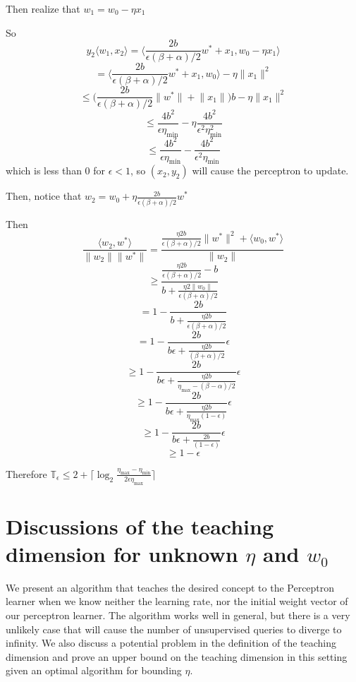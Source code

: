 \documentclass{article}
\begin{document}
Then realize that
$w_1 = w_0 - \eta x_1$

So
$$
y_2 \langle w_1, x_2 \rangle  = \bigg\langle \frac{2 b}{\epsilon (\beta + \alpha) /2} w^* + x_1 , w_0 - \eta x_1 \bigg\rangle
$$
$$
= \bigg\langle \frac{2 b}{\epsilon (\beta + \alpha) /2} w^* + x_1 , w_0  \bigg\rangle - \eta \lVert x_1 \rVert^2
$$
$$
\leq \bigg( \frac{2 b}{\epsilon (\beta + \alpha) /2} \lVert w^* \rVert + \lVert x_1 \rVert \bigg ) b - \eta \lVert x_1 \rVert^2
$$
$$
\leq \frac{4 b ^2}{\epsilon \eta_{\min}} - \eta \frac{4 b^2}{\epsilon^2 \eta_{\min}^2}
$$
$$
\leq \frac{4 b^2}{\epsilon \eta_{\min}}  -  \frac{4 b^2}{\epsilon^2 \eta_{\min}}
$$
which is less than $0$ for $\epsilon < 1$, so $(x_2 , y_2)$ will cause the perceptron to update.

Then,
notice that $w_2 = w_0 +\eta \frac{2  b}{\epsilon (\beta + \alpha)/2} w^*$

Then 
$$
\frac{\langle w_2, w^* \rangle}{\lVert w_2 \rVert \lVert w^* \rVert} = \frac{
\frac{\eta 2  b}{\epsilon (\beta + \alpha)/2} \lVert w^* \lVert ^2 + \langle w_0, w^* \rangle}{\lVert w_2 \rVert}
$$ 
$$
\geq \frac{\frac{\eta 2  b}{\epsilon (\beta + \alpha)/2} - b}{b +\frac{\eta 2  \lVert w_0 \rVert}{\epsilon (\beta + \alpha)/2} }
$$
$$
= 1 - \frac{2 b}{b +\frac{\eta 2  b}{\epsilon (\beta + \alpha)/2} }
$$
$$
= 1 - \frac{2b}{b \epsilon + \frac{\eta 2  b}{(\beta + \alpha)/2} } \epsilon
$$
$$
\geq  1 - \frac{2b}{b \epsilon + \frac{\eta 2  b}{\eta_{\max} - (\beta - \alpha) / 2} } \epsilon
$$
$$
\geq  1 - \frac{2b}{b \epsilon + \frac{\eta 2  b}{\eta_{\max} (1-\epsilon)} } \epsilon
$$
$$
\geq 1 - \frac{2b}{b \epsilon + \frac{ 2  b}{(1-\epsilon)} } \epsilon
$$
$$
\geq 1 - \epsilon
$$

Therefore 
$\mathbb{T}_\epsilon \leq  2 + \lceil \log_2 \frac{\eta_{\max} - \eta_{\min}}{2\epsilon\eta_{\max}}  \rceil$

\section{Discussions of the teaching dimension for unknown $\eta$ and $w_0$}

We present an algorithm that teaches the desired concept to the Perceptron
learner when we know neither the learning rate, nor the initial weight vector of
our perceptron learner. The algorithm works well in general, but there is a very
unlikely case that will cause the number of unsupervised queries to diverge to
infinity. We also discuss a potential problem in the definition of the teaching
dimension and prove an upper bound on the teaching dimension in this setting
given an optimal algorithm for bounding $\eta$.
\end{document}
